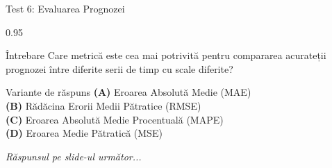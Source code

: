 \documentclass[9pt, aspectratio=169, t]{beamer}
\begin{document}
\begin{frame}{Test 6: Evaluarea Prognozei}
    \begin{cminipage}{0.95\textwidth}
    \begin{alertblock}{Întrebare}
        Care metrică este cea mai potrivită pentru compararea acurateții prognozei între diferite serii de timp cu scale diferite?
    \end{alertblock}

    \vspace{0.4cm}

    \begin{block}{Variante de răspuns}
    \textcolor{MainBlue}{\textbf{(A)}} Eroarea Absolută Medie (MAE)\\[3pt]
    \textcolor{MainBlue}{\textbf{(B)}} Rădăcina Erorii Medii Pătratice (RMSE)\\[3pt]
    \textcolor{MainBlue}{\textbf{(C)}} Eroarea Absolută Medie Procentuală (MAPE)\\[3pt]
    \textcolor{MainBlue}{\textbf{(D)}} Eroarea Medie Pătratică (MSE)
    \end{block}
    \vspace{0.5cm}

    \begin{center}
        \textit{Răspunsul pe slide-ul următor...}
    \end{center}
    \end{cminipage}
\end{frame}
\end{document}
